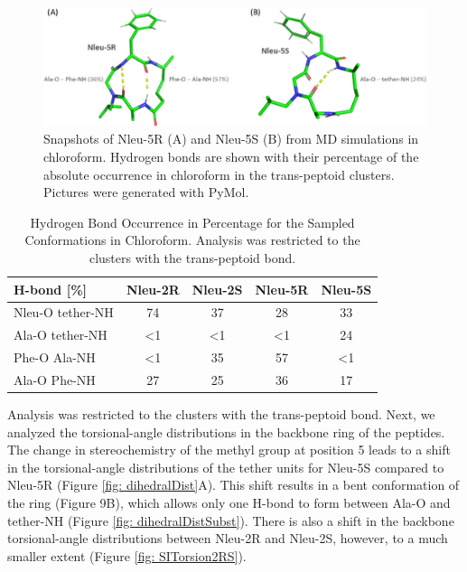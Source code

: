 \begin{figure}
    \centering
    \includegraphics[width=\textwidth]{fig/results/ExampleHbonds.jpeg}
    \caption{Snapshots of Nleu-5R (A) and Nleu-5S (B) from MD simulations in chloroform. Hydrogen bonds are shown with their percentage of the absolute occurrence in chloroform in the trans-peptoid clusters. Pictures were generated with PyMol. \cite{DeLano2020}}
    \label{fig: HbondExamples}
\end{figure}

\begin{table}[]
    \centering
    \begin{tabular}{l|c|c|c|c}
    H-bond  [\%] &	Nleu-2R &	Nleu-2S &	Nleu-5R &	Nleu-5S  \\
    \hline
    Nleu-O tether-NH &	74 &	37 &	28 &	33 \\
    Ala-O tether-NH &	<1 &	<1 &	<1 &	24 \\
    Phe-O Ala-NH    &	<1 &	35 &	57 &	<1 \\
    Ala-O Phe-NH    &	27 &	25 &	36 &	17 \\
    \end{tabular}
    \caption{Hydrogen Bond Occurrence in Percentage for the Sampled Conformations in Chloroform. Analysis was restricted to the clusters with the trans-peptoid bond.}
    \label{tab: hbondsrationCLCH3}
\end{table}

Analysis was restricted to the clusters with the trans-peptoid bond.
Next, we analyzed the torsional-angle distributions in the backbone ring of the peptides. The change in stereochemistry of the methyl group at position 5 leads to a shift in the torsional-angle distributions of the tether units for Nleu-5S compared to Nleu-5R (Figure \ref{fig: dihedralDist}A). This shift results in a bent conformation of the ring (Figure 9B), which allows only one H-bond to form between Ala-O and tether-NH (Figure \ref{fig: dihedralDistSubst}). There is also a shift in the backbone torsional-angle distributions between Nleu-2R and Nleu-2S, however, to a much smaller extent (Figure \ref{fig: SITorsion2RS}).

